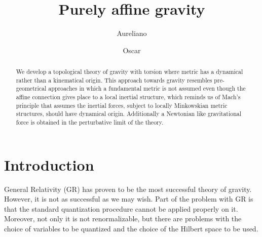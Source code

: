\documentclass[twocolumn,
  showpacs,showkeys,prd,superscriptaddress]{revtex4-1}
\begin{document}
\title{Purely affine gravity}


\author{Aureliano }

\author{Oscar }

\begin{abstract}
  We develop a topological theory of gravity with torsion where metric has a dynamical rather than a kinematical origin. This approach towards gravity resembles pre-geometrical approaches in which a fundamental metric is not assumed even though the  affine connection gives place to a local inertial structure, which reminds us of Mach's principle that assumes the inertial forces, subject to locally Minkowskian metric structures, should have dynamical origin. Additionally a Newtonian like gravitational force is obtained in the perturbative limit of the theory.
\end{abstract}


\maketitle

\section{Introduction}

General Relativity (GR) has proven to be the most successful theory of gravity.  However,  it is not as successful as we may wish. Part of the problem with GR is that the standard quantization procedure cannot be applied  properly on it. Moreover, not only it is not renormalizable, but there are  problems with the choice of variables to be quantized and the choice of the Hilbert space to be used. 
\end{document}
